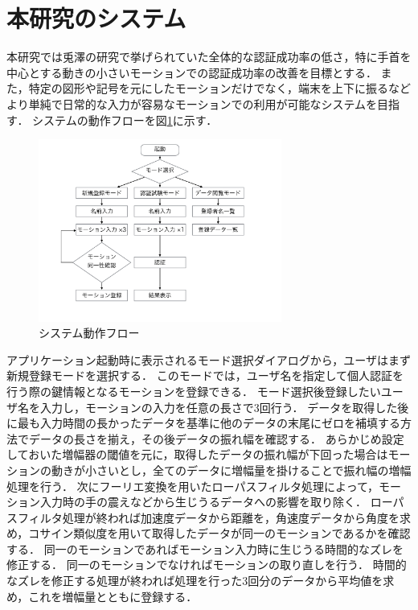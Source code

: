 \section{本研究のシステム}
本研究では兎澤の研究で挙げられていた全体的な認証成功率の低さ，特に手首を中心とする動きの小さいモーションでの認証成功率の改善を目標とする．
また，特定の図形や記号を元にしたモーションだけでなく，端末を上下に振るなどより単純で日常的な入力が容易なモーションでの利用が可能なシステムを目指す．
システムの動作フローを図\ref{flow}に示す．

\begin{figure}[bthp]
    \centering
    \includegraphics[bb=0 100 950 750, width=80mm]{flow.pdf}
    \caption{システム動作フロー}
    \label{flow}
\end{figure}

アプリケーション起動時に表示されるモード選択ダイアログから，ユーザはまず新規登録モードを選択する．
このモードでは，ユーザ名を指定して個人認証を行う際の鍵情報となるモーションを登録できる．
モード選択後登録したいユーザ名を入力し，モーションの入力を任意の長さで3回行う．
データを取得した後に最も入力時間の長かったデータを基準に他のデータの末尾にゼロを補填する方法でデータの長さを揃え，その後データの振れ幅を確認する．
あらかじめ設定しておいた増幅器の閾値を元に，取得したデータの振れ幅が下回った場合はモーションの動きが小さいとし，全てのデータに増幅量を掛けることで振れ幅の増幅処理を行う．
次にフーリエ変換を用いたローパスフィルタ処理によって，モーション入力時の手の震えなどから生じうるデータへの影響を取り除く．
ローパスフィルタ処理が終われば加速度データから距離を，角速度データから角度を求め，コサイン類似度を用いて取得したデータが同一のモーションであるかを確認する．
同一のモーションであればモーション入力時に生じうる時間的なズレを修正する．
同一のモーションでなければモーションの取り直しを行う．
時間的なズレを修正する処理が終われば処理を行った3回分のデータから平均値を求め，これを増幅量とともに登録する．

